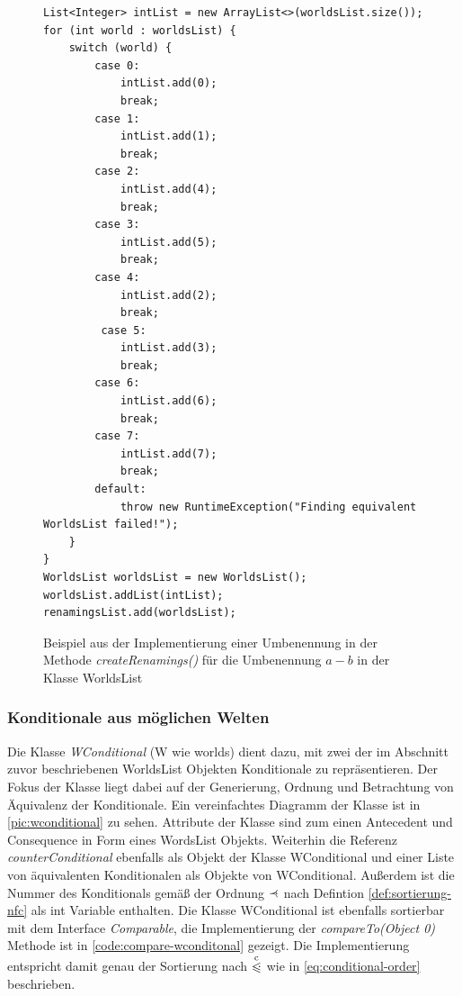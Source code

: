 \documentclass[12pt,a4paper]{article}
\newcommand\dotll{\mathrel{%
    \mathchoice{\QEQQ}{\QEQQ}{\QEQQ}{\QEQQ}%
}}
\def\QEQQ{{%
    \setbox0\hbox{$\leqslant$}%
    \rlap{\hbox to \wd0{\hss \raisebox {1pt}{$\ \cdot$\hss}}}\box0
}}
\newcommand\rdotl{\mathrel{%
    \mathchoice{\RQEQ}{\RQEQ}{\RQEQ}{\RQEQ}%
}}
\def\RQEQ{{%
    \setbox0\hbox{$\prec$}%
    \rlap{\hbox to \wd0{\hss \raisebox {0.01pt}{$\ \cdot$\hss}}}\box0
}}
\begin{document}
\begin{figure}
\begin{lstlisting}
List<Integer> intList = new ArrayList<>(worldsList.size());
for (int world : worldsList) {
    switch (world) {
        case 0:
            intList.add(0);
            break;
        case 1:
            intList.add(1);
            break;
        case 2:
            intList.add(4);
            break;
        case 3:
            intList.add(5);
            break;
        case 4:
            intList.add(2);
            break;
         case 5:
            intList.add(3);
            break;
        case 6:
            intList.add(6);
            break;
        case 7:
            intList.add(7);
            break;
        default:
            throw new RuntimeException("Finding equivalent WorldsList failed!");
    }
}
WorldsList worldsList = new WorldsList();
worldsList.addList(intList);
renamingsList.add(worldsList);
\end{lstlisting}
\caption{Beispiel aus der Implementierung einer Umbenennung in der Methode \textit{createRenamings()} für die Umbenennung $a-b$ in der Klasse WorldsList}
\label{code:renaming}
\end{figure}



\subsubsection{Konditionale aus möglichen Welten} 



Die Klasse \textit{WConditional} (W wie worlds) dient dazu, mit zwei der im Abschnitt zuvor beschriebenen WorldsList Objekten Konditionale zu repräsentieren. Der Fokus der Klasse liegt dabei auf der Generierung, Ordnung und Betrachtung von Äquivalenz der Konditionale. Ein vereinfachtes Diagramm der Klasse ist in \autoref{pic:wconditional} zu sehen. Attribute der Klasse sind zum einen Antecedent und Consequence in Form eines WordsList Objekts. Weiterhin die Referenz \textit{counterConditional} ebenfalls als Objekt der Klasse WConditional und einer Liste von äquivalenten Konditionalen als Objekte von WConditional. Außerdem ist die Nummer des Konditionals gemäß der Ordnung $\rdotl$ nach Defintion \ref{def:sortierung-nfc} als int Variable enthalten. Die Klasse WConditional ist ebenfalls sortierbar mit dem Interface \textit{Comparable}, die Implementierung der \textit{compareTo(Object 0)} Methode ist in \autoref{code:compare-wconditonal} gezeigt. Die Implementierung entspricht damit genau der Sortierung nach $\overset{\mathrm{c}}{\dotll}$ wie in \autoref{eq:conditional-order} beschrieben.
\end{document}
